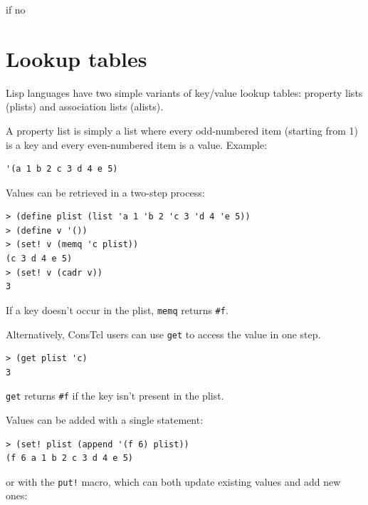 \documentclass[twoside,9pt]{report}
\begin{document}
if no {

\chapter{Lookup tables}
\label{lookup-tables}

Lisp languages have two simple variants of key/value lookup tables: property lists (plists) and association lists (alists).


A property list is simply a list where every odd-numbered item (starting from 1) is a key and every even-numbered item is a value. Example:

\noindent\makebox[\linewidth]{\rule{\linewidth}{0.4pt}}
\begin{lstlisting}
'(a 1 b 2 c 3 d 4 e 5)
\end{lstlisting}
\noindent\makebox[\linewidth]{\rule{\linewidth}{0.4pt}}

Values can be retrieved in a two-step process:

\noindent\makebox[\linewidth]{\rule{\linewidth}{0.4pt}}
\begin{lstlisting}
> (define plist (list 'a 1 'b 2 'c 3 'd 4 'e 5))
> (define v '())
> (set! v (memq 'c plist))
(c 3 d 4 e 5)
> (set! v (cadr v))
3
\end{lstlisting}
\noindent\makebox[\linewidth]{\rule{\linewidth}{0.4pt}}

If a key doesn't occur in the plist, \texttt{memq} returns \texttt{\#f}.


Alternatively, ConsTcl users can use \texttt{get} to access the value in one step.

\noindent\makebox[\linewidth]{\rule{\linewidth}{0.4pt}}
\begin{lstlisting}
> (get plist 'c)
3
\end{lstlisting}
\noindent\makebox[\linewidth]{\rule{\linewidth}{0.4pt}}

\texttt{get} returns \texttt{\#f} if the key isn't present in the plist.


Values can be added with a single statement:

\noindent\makebox[\linewidth]{\rule{\linewidth}{0.4pt}}
\begin{lstlisting}
> (set! plist (append '(f 6) plist))
(f 6 a 1 b 2 c 3 d 4 e 5)
\end{lstlisting}
\noindent\makebox[\linewidth]{\rule{\linewidth}{0.4pt}}

or with the \texttt{put!} macro, which can both update existing values and add new ones:

}
\end{document}
